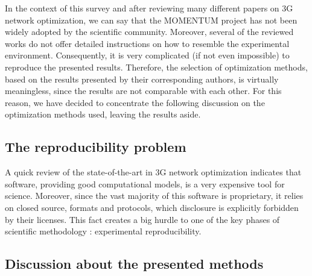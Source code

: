 In the context of this survey and after reviewing many different papers
on 3G network optimization, we can say that the MOMENTUM project has
not been widely adopted by the scientific community. Moreover, several
of the reviewed works do not offer detailed instructions on how to
resemble the experimental environment. Consequently, it is very complicated
(if not even impossible) to reproduce the presented results. Therefore,
the selection of optimization methods, based on the results presented
by their corresponding authors, is virtually meaningless, since the
results are not comparable with each other. For this reason, we have
decided to concentrate the following discussion on the optimization
methods used, leaving the results aside.


\subsection{The reproducibility problem}

A quick review of the state-of-the-art in 3G network optimization
indicates that software, providing good computational models, is a
very expensive tool for science. Moreover, since the vast majority
of this software is proprietary, it relies on closed source, formats
and protocols, which disclosure is explicitly forbidden by their licenses.
This fact creates a big hurdle to one of the key phases of scientific
methodology \cite{gauch2002scientific}: experimental reproducibility.


\subsection{Discussion about the presented methods}

